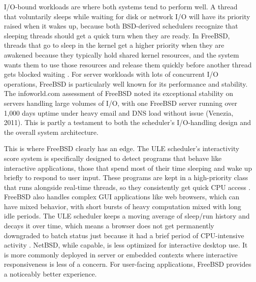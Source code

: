 I/O-bound workloads are where both systems tend to perform well. A thread that voluntarily sleeps while waiting for disk or network I/O will have its priority raised when it wakes up, because both BSD-derived schedulers recognize that sleeping threads should get a quick turn when they are ready. In FreeBSD, threads that go to sleep in the kernel get a higher priority when they are awakened because they typically hold shared kernel resources, and the system wants them to use those resources and release them quickly before another thread gets blocked waiting \parencite{watson2015}.
For server workloads with lots of concurrent I/O operations, FreeBSD is particularly well known for its performance and stability. The infoworld.com assessment of FreeBSD noted its exceptional stability on servers handling large volumes of I/O, with one FreeBSD server running over 1,000 days uptime under heavy email and DNS load without issue (Venezia, 2011). This is partly a testament to both the scheduler's I/O-handling design and the overall system architecture.

This is where FreeBSD clearly has an edge. The ULE scheduler's interactivity score system is specifically designed to detect programs that behave like interactive applications, those that spend most of their time sleeping and wake up briefly to respond to user input. These programs are kept in a high-priority class that runs alongside real-time threads, so they consistently get quick CPU access \parencite{watson2015}.
FreeBSD also handles complex GUI applications like web browsers, which can have mixed behavior, with short bursts of heavy computation mixed with long idle periods. The ULE scheduler keeps a moving average of sleep/run history and decays it over time, which means a browser does not get permanently downgraded to batch status just because it had a brief period of CPU-intensive activity \parencite{watson2015}.
NetBSD, while capable, is less optimized for interactive desktop use. It is more commonly deployed in server or embedded contexts where interactive responsiveness is less of a concern. For user-facing applications, FreeBSD provides a noticeably better experience.

